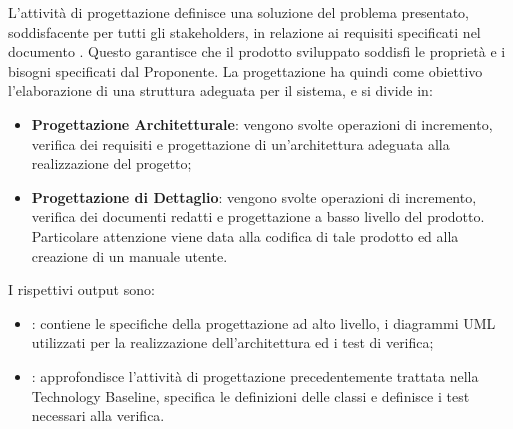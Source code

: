                      
        L'attività di progettazione definisce una soluzione del problema presentato, soddisfacente per tutti gli stakeholders, in relazione ai requisiti specificati nel documento \AdR{}. Questo garantisce che il prodotto sviluppato soddisfi le proprietà e i bisogni specificati dal Proponente. 
        La progettazione ha quindi come obiettivo l'elaborazione di una struttura adeguata per il sistema, e si divide in:
        \begin{itemize}
        	\item{\textbf{Progettazione Architetturale}}: vengono svolte operazioni di incremento, verifica dei requisiti e progettazione di un'architettura adeguata alla realizzazione del progetto;
        	\item{\textbf{Progettazione di Dettaglio}}: vengono svolte operazioni di incremento, verifica dei documenti redatti e progettazione a basso livello del prodotto. Particolare attenzione viene data alla codifica di tale prodotto ed alla creazione di un manuale utente.
        \end{itemize}
    	I rispettivi output sono:
        \begin{itemize}
           	\item{\textbf{\TB{}}: contiene le specifiche della progettazione ad alto livello, i diagrammi UML utilizzati per la realizzazione dell'architettura ed i test di verifica;}
			\item{\textbf{\PB{}}: approfondisce l'attività di progettazione precedentemente trattata nella Technology Baseline, specifica le definizioni delle classi e definisce i test necessari alla verifica.}
   		\end{itemize}
  
